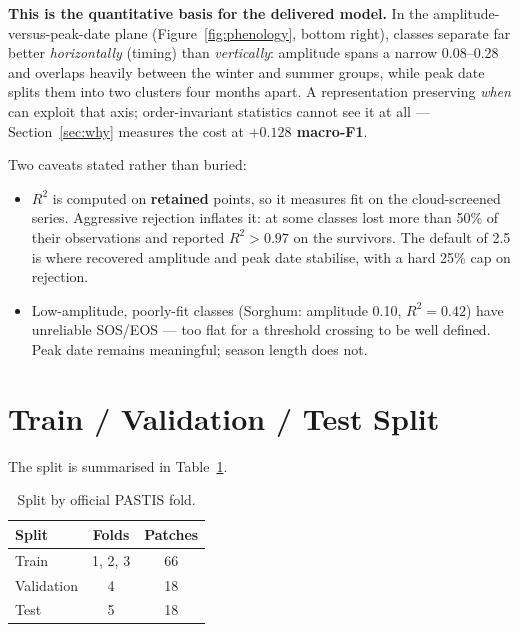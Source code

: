 \documentclass[11pt,a4paper]{article}
\newcommand{\file}[1]{\texttt{\detokenize{#1}}}
\begin{document}
\textbf{This is the quantitative basis for the delivered model.} In the
amplitude-versus-peak-date plane (Figure~\ref{fig:phenology}, bottom right),
classes separate far better \emph{horizontally} (timing) than
\emph{vertically}: amplitude spans a narrow 0.08--0.28 and overlaps heavily
between the winter and summer groups, while peak date splits them into two
clusters four months apart. A representation preserving \emph{when} can exploit
that axis; order-invariant statistics cannot see it at all ---
Section~\ref{sec:why} measures the cost at \textbf{$+0.128$ macro-F1}.

Two caveats stated rather than buried:
\begin{itemize}[leftmargin=*]
  \item $R^2$ is computed on \textbf{retained} points, so it measures fit on the
        cloud-screened series. Aggressive rejection inflates it: at
        \file{reject_sigma=1.5} some classes lost more than 50\% of their
        observations and reported $R^2>0.97$ on the survivors. The default of
        2.5 is where recovered amplitude and peak date stabilise, with a hard
        25\% cap on rejection.
  \item Low-amplitude, poorly-fit classes (Sorghum: amplitude 0.10,
        $R^2=0.42$) have unreliable SOS/EOS --- too flat for a threshold
        crossing to be well defined. Peak date remains meaningful; season length
        does not.
\end{itemize}

\section{Train / Validation / Test Split}\label{sec:split}

The split is summarised in Table~\ref{tab:split}.

\begin{table}[htbp]
\centering
\caption{Split by official PASTIS fold.}
\label{tab:split}
\begin{tabular}{lcc}
\toprule
\textbf{Split} & \textbf{Folds} & \textbf{Patches} \\
\midrule
Train      & 1, 2, 3 & 66 \\
Validation & 4       & 18 \\
Test       & 5       & 18 \\
\bottomrule
\end{tabular}
\end{table}
\end{document}
